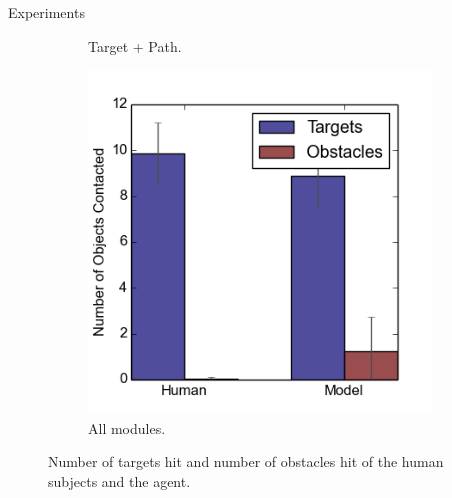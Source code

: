 \documentclass[final]{beamer}
\begin{document}
\begin{frame}{}
\begin{textblock}{37}
\begin{block}{Experiments}
\begin{figure}[h]
\begin{subfigure}[b]{0.24\textwidth}
\caption{Target + Path.}
\end{subfigure}
\begin{subfigure}[b]{0.24\textwidth}
\includegraphics[width=\textwidth]{contact4.png}
\caption{All modules.}
\end{subfigure}
\caption{Number of targets hit and number of obstacles hit of the human subjects 
and the agent.}
\label{fig:stats}
\end{figure}


\end{block}
\end{textblock}
\end{frame}
\end{document}

